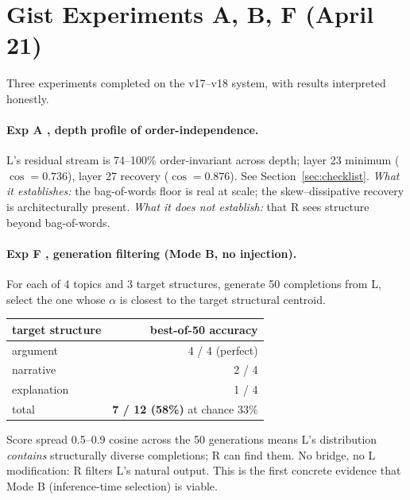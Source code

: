 \documentclass[10pt, twocolumn, a4paper]{article}
\begin{document}
\section{Gist Experiments A, B, F (April 21)}

Three experiments completed on the v17--v18 system, with results interpreted honestly.

\paragraph{Exp A ,  depth profile of order-independence.} L's residual stream is 74--100\% order-invariant across depth; layer 23 minimum ($\cos=0.736$), layer 27 recovery ($\cos=0.876$). See Section~\ref{sec:checklist}. \emph{What it establishes:} the bag-of-words floor is real at scale; the skew--dissipative recovery is architecturally present. \emph{What it does not establish:} that R sees structure beyond bag-of-words.

\paragraph{Exp F ,  generation filtering (Mode B, no injection).} For each of 4 topics and 3 target structures, generate 50 completions from L, select the one whose $\alpha$ is closest to the target structural centroid.
\begin{center}\small
\begin{tabular}{lr}
\toprule
target structure & best-of-50 accuracy \\
\midrule
argument    & 4 / 4 (perfect) \\
narrative   & 2 / 4 \\
explanation & 1 / 4 \\
\midrule
total       & \textbf{7 / 12 (58\%)} at chance 33\% \\
\bottomrule
\end{tabular}
\end{center}
Score spread 0.5--0.9 cosine across the 50 generations means L's distribution \emph{contains} structurally diverse completions; R can find them. No bridge, no L modification: R filters L's natural output. This is the first concrete evidence that Mode B (inference-time selection) is viable.
\end{document}
